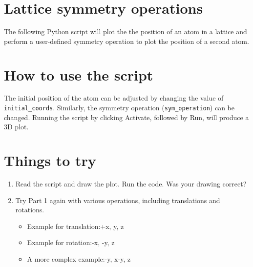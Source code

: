 \documentclass{article}
\begin{document}
\section{Lattice symmetry operations}

The following Python script will plot the the position of an atom in a lattice and perform a user-defined symmetry operation to plot the position of a second atom.

\section{How to use the script}
The initial position of the atom can be adjusted by changing the value of \texttt{initial\_coords}. Similarly, the symmetry operation (\texttt{sym\_operation}) can be changed. Running the script by clicking Activate, followed by Run, will produce a 3D plot.

\section{Things to try}
\begin{enumerate}
\item Read the script and draw the plot. Run the code. Was your drawing correct?
\item Try Part 1 again with various operations, including translations and rotations.
\begin{itemize}
\item Example for translation:+x, y, z
\item Example for rotation:\tab-x, -y, z
\item A more complex example:\tab-y, x-y, z
\end{itemize}
\end{enumerate}
\end{document}
